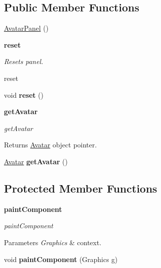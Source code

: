 \subsection*{Public Member Functions}
\begin{DoxyCompactItemize}
\item 
\hyperlink{classbattleship_1_1screen_1_1AvatarPanel_a494f6f66667fd7fb5e3be67937882244}{Avatar\+Panel} ()
\end{DoxyCompactItemize}
\begin{Indent}{\bf reset}\par
{\em Reset\textquotesingle{}s panel.

reset }\begin{DoxyCompactItemize}
\item 
\hypertarget{classbattleship_1_1screen_1_1AvatarPanel_aadf11b4cba40b3ad4bd493132356ba02}{}void {\bfseries reset} ()\label{classbattleship_1_1screen_1_1AvatarPanel_aadf11b4cba40b3ad4bd493132356ba02}

\end{DoxyCompactItemize}
\end{Indent}
\begin{Indent}{\bf get\+Avatar}\par
{\em get\+Avatar

\begin{DoxyReturn}{Returns}
\hyperlink{classbattleship_1_1screen_1_1Avatar}{Avatar} object pointer. 
\end{DoxyReturn}
}\begin{DoxyCompactItemize}
\item 
\hypertarget{classbattleship_1_1screen_1_1AvatarPanel_a533cbd9269d2078c10d43f50b54d3ac2}{}\hyperlink{classbattleship_1_1screen_1_1Avatar}{Avatar} {\bfseries get\+Avatar} ()\label{classbattleship_1_1screen_1_1AvatarPanel_a533cbd9269d2078c10d43f50b54d3ac2}

\end{DoxyCompactItemize}
\end{Indent}
\subsection*{Protected Member Functions}
\begin{Indent}{\bf paint\+Component}\par
{\em paint\+Component


\begin{DoxyParams}{Parameters}
{\em Graphics} & context. \\
\hline
\end{DoxyParams}
}\begin{DoxyCompactItemize}
\item 
\hypertarget{classbattleship_1_1screen_1_1AvatarPanel_a88474f65da032501aa454a53a644d363}{}void {\bfseries paint\+Component} (Graphics g)\label{classbattleship_1_1screen_1_1AvatarPanel_a88474f65da032501aa454a53a644d363}

\end{DoxyCompactItemize}
\end{Indent}


